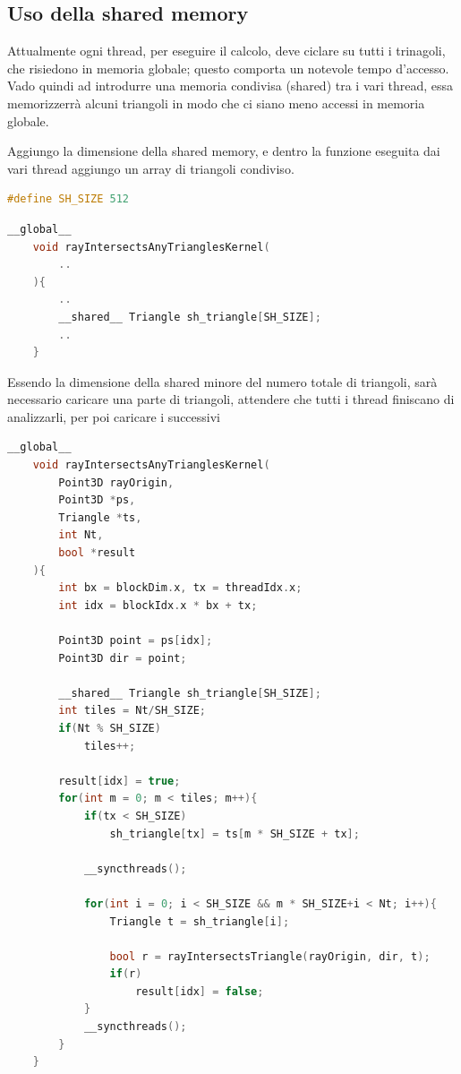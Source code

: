 \documentclass[a4paper]{article}
\begin{document}
\newpage

\subsection{Uso della shared memory}
Attualmente ogni thread, per eseguire il calcolo, deve ciclare su tutti i trinagoli, che risiedono in memoria globale; questo comporta un notevole tempo d'accesso.
Vado quindi ad introdurre una memoria condivisa (shared) tra i vari thread, essa memorizzerrà alcuni triangoli in modo che ci siano meno accessi in memoria globale.

Aggiungo la dimensione della shared memory, e dentro la funzione eseguita dai vari thread aggiungo un array di triangoli condiviso.

\begin{lstlisting}[language=c++]
    #define SH_SIZE 512
\end{lstlisting}

\begin{lstlisting}[language=c++]
    __global__
    void rayIntersectsAnyTrianglesKernel(
        ..
    ){
        ..
        __shared__ Triangle sh_triangle[SH_SIZE];
        ..
    }
\end{lstlisting}

Essendo la dimensione della shared minore del numero totale di triangoli, sarà necessario caricare una parte di triangoli, attendere che tutti i thread finiscano di analizzarli, per poi caricare i successivi

\begin{lstlisting}[language=c++]
    __global__
    void rayIntersectsAnyTrianglesKernel(
        Point3D rayOrigin, 
        Point3D *ps,
        Triangle *ts,
        int Nt,
        bool *result
    ){
        int bx = blockDim.x, tx = threadIdx.x;
        int idx = blockIdx.x * bx + tx;
    
        Point3D point = ps[idx];
        Point3D dir = point;
    
        __shared__ Triangle sh_triangle[SH_SIZE];
        int tiles = Nt/SH_SIZE;
        if(Nt % SH_SIZE)
            tiles++;

        result[idx] = true;
        for(int m = 0; m < tiles; m++){
            if(tx < SH_SIZE)
                sh_triangle[tx] = ts[m * SH_SIZE + tx];
            
            __syncthreads();
    
            for(int i = 0; i < SH_SIZE && m * SH_SIZE+i < Nt; i++){
                Triangle t = sh_triangle[i];
                
                bool r = rayIntersectsTriangle(rayOrigin, dir, t);
                if(r)
                    result[idx] = false;	
            }
            __syncthreads();
        }	
    }
\end{lstlisting}
\end{document}

